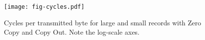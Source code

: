 \begin{figure}[H]
\texttt{[image: fig-cycles.pdf]}
\caption{Cycles per transmitted byte for large and small records with Zero Copy and Copy Out. Note the log-scale axes.}
\label{fig:cycles}
\end{figure}
